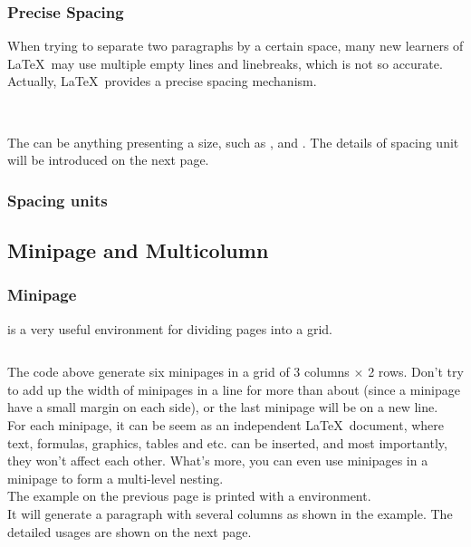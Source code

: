 \begin{frame}[fragile]
	\frametitle{Precise Spacing}
	When trying to separate two paragraphs by a certain space, many new learners of \LaTeX\ may use multiple empty lines and linebreaks, which is not so accurate. Actually, \LaTeX\ provides a precise spacing mechanism.
	\begin{command}
		\texttt{\vspace{space}}\\
		\texttt{\vspace*{space}}
	\end{command}
	The  can be anything presenting a size, such as \structure{1cm}, \structure{2em} and \structure{10pt}. The details of spacing unit will be introduced on the next page.
\end{frame}

\begin{frame}
	\frametitle{Spacing units}

\end{frame}

\subsection{Minipage and Multicolumn}

\begin{frame}[fragile]
	\frametitle{Minipage}
	 is a very useful environment for dividing pages into a grid.
	\begin{example}
		\begin{multicols}{2}
			\inputminted[xleftmargin=1.5em]{latex}{examples/minipage.tex}
		\end{multicols}
	\end{example}
\end{frame}

\begin{frame}
	The code above generate six minipages in a grid of 3 columns $\times$ 2 rows. Don't try to add up the width of minipages in a line for more than about  (since a minipage have a small margin on each side), or the last minipage will be on a new line. \\[0.5em]
	For each minipage, it can be seem as an independent \LaTeX\ document, where text, formulas, graphics, tables and etc. can be inserted, and most importantly, they won't affect each other. What's more, you can even use minipages in a minipage to form a multi-level nesting. \\

	The example on the previous page is printed with a   environment. \\[0.5em]
	It will generate a paragraph with several columns as shown in the example. The detailed usages are shown on the next page.
\end{frame}

